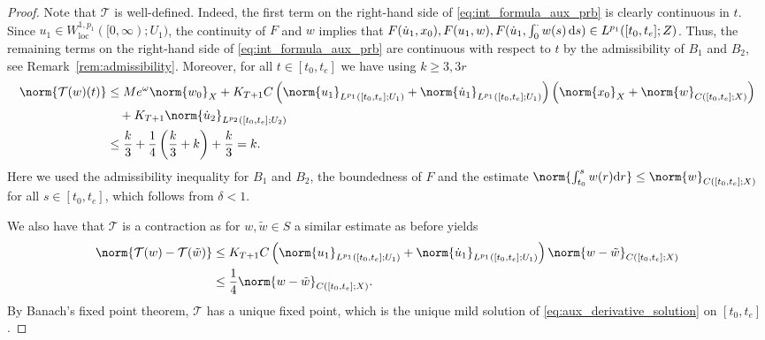\documentclass{cocv}
\newcommand{\ds}{ {\, \rm d} s}
\DeclareMathOperator{\loc}{loc}
\theoremstyle{definition}
\begin{document}
\begin{proof}
    Note that $\mathcal T$ is well-defined. Indeed, the first term on the right-hand side of \eqref{eq:int_formula_aux_prb} is clearly continuous in $t$.
    Since $u_1\in W^{1,{p_1}}_{\loc}([0,\infty);U_1)$, the continuity of $F$ and $w$ implies that $F(\dot u_1,x_0), F(u_1,w), F(\dot u_1, \int_0^{\cdot}w(s)\ds) \in L^{p_1}([t_0,t_e];Z)$. Thus, the remaining terms on the right-hand side of \eqref{eq:int_formula_aux_prb} are continuous with respect to $t$ by the admissibility of $B_1$ and $B_2$, see Remark~\ref{rem:admissibility}.   
    Moreover, for all $t \in [t_0, t_e]$ we have using $k \ge 3, 3r$
    \begin{align*}
        \norm{\mathcal T(w)(t)} 
        &\le Me^{\omega}\norm{w_0}_X + K_{T+1}C \left(\norm{u_1}_{L^{p_1}([t_0, t_e];U_1)} + \norm{\dot u_1}_{L^{p_1}([t_0, t_e];U_1) } \right)\left(\norm{x_0}_X + \norm{w}_{C([t_0,t_e];X)}\right)\\
        & \hspace{1em}+K_{T+1} \norm{\dot u_2}_{L^{p_2}([t_0, t_e];U_2)} \\
        &\le \frac{k}{3} + \frac14\left(\frac k3 + k\right) + \frac k3= k.
    \end{align*}
    Here we used the admissibility inequality for $B_1$ and $B_2$, the boundedness of $F$ and the estimate $\norm{\int_{t_0}^s w(r) \mathrm{d}r} \leq \norm{w}_{C([t_0,t_e];X)}$ for all $s \in [t_0,t_e]$, which follows from $\delta<1$.
    
    We also have that $\mathcal T$ is a contraction as for $w,\tilde w \in S$ a similar estimate as before yields
    \begin{align*}
        \norm{\mathcal T(w) - \mathcal T(\tilde w)} &\le K_{T+1}C \left(\norm {u_1}_{L^{p_1}([t_0, t_e]; U_1)} + \norm{\dot u_1}_{L^{p_1}([t_0, t_e]; U_1)}\right)\norm{w - \tilde w}_{C([t_0,t_e];X)} \\
        &\leq \frac{1}{4} \norm{w - \tilde w}_{C([t_0,t_e];X)}.
    \end{align*}
    By Banach's fixed point theorem, $\mathcal T$ has a unique fixed point, which is the unique mild solution of \eqref{eq:aux_derivative_solution} on $[t_0,t_e]$.
    


\end{proof}
\end{document}
